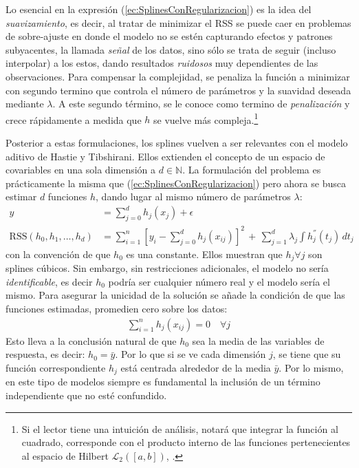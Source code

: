 \documentclass[../../Main/Main.tex]{subfiles}
\begin{document}
Lo esencial en la expresión (\ref{ec:SplinesConRegularizacion}) es la idea del \emph{suavizamiento}, es decir, al tratar de minimizar el RSS se puede caer en problemas de sobre-ajuste en donde el modelo no se estén capturando efectos y patrones subyacentes, la llamada \emph{señal} de los datos, sino sólo se trata de seguir (incluso interpolar) a los estos, dando resultados \textit{ruidosos} muy dependientes de las observaciones. Para compensar la complejidad, se penaliza la función a minimizar con segundo termino que controla el número de parámetros y la suavidad deseada mediante $\lambda$. A este segundo término, se le conoce como termino de \emph{penalización} y crece rápidamente a medida que $h$ se vuelve más compleja.\footnote{Si el lector tiene una intuición de análisis, notará que integrar la función al cuadrado, corresponde con el producto interno de las funciones pertenecientes al espacio de Hilbert $\mathcal{L}_2([a,b])$, \citet{bergstrom1985estimation}.}

Posterior a estas formulaciones, los splines vuelven a ser relevantes con el modelo aditivo de Hastie y Tibshirani. Ellos extienden el concepto de un espacio de covariables en una sola dimensión a $d\in\mathbb{N}$. La formulación del problema es prácticamente la misma que  (\ref{ec:SplinesConRegularizacion}) pero ahora se busca estimar $d$ funciones $h$, dando lugar al mismo número de parámetros $\lambda$:
\begin{align*}
	y &= \sum_{j = 0}^d h_j(x_j) + \epsilon \\	
	\text{RSS}(h_0, h_1, \ldots, h_d) &= \sum_{i = 1}^n[y_i - \sum_{j = 0}^d h_j(x_{ij})]^2 \, + \, \sum_{j = 1}^d\lambda_j 			\int h_j^{''}(t_j) \, dt_j
\end{align*}
con la convención de que $h_0$ es una constante. Ellos muestran que $h_j \forall j$ son splines cúbicos. Sin embargo, sin restricciones adicionales, el modelo no sería \textit{identificable}, es decir $h_0$ podría ser cualquier número real y el modelo sería el mismo. Para asegurar la unicidad de la solución se añade la condición de que las funciones estimadas, promedien cero sobre los datos:
\begin{align}
	\sum_{i = 1}^n h_j(x_{ij}) = 0 \quad \forall j \label{ec:RestriccionGAM}
\end{align}
Esto lleva a la conclusión natural de que $h_0$ sea la media de las variables de respuesta, es decir: $h_0 = \bar{y}$. Por lo que si se ve cada dimensión $j$, se tiene que su función correspondiente $h_j$ está centrada alrededor de la media $\bar{y}$. Por lo mismo, en este tipo de modelos siempre es fundamental la inclusión de un término independiente que no esté confundido.
\end{document}
